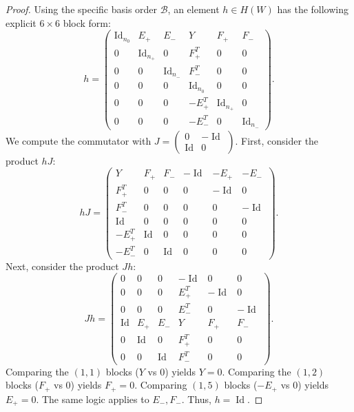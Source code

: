 \documentclass[12pt, final]{article}
\def\Id{\operatorname{Id}}
\begin{document}
\begin{proof}
Using the specific basis order $\mathcal{B}$, an element $h \in H(W)$ has the following explicit $6 \times 6$ block form:
\[
h = \begin{pmatrix}
\Id_{n_0} & E_+ & E_- & Y & F_+ & F_- \\
0 & \Id_{n_+} & 0 & F_+^T & 0 & 0 \\
0 & 0 & \Id_{n_-} & F_-^T & 0 & 0 \\
0 & 0 & 0 & \Id_{n_0} & 0 & 0 \\
0 & 0 & 0 & -E_+^T & \Id_{n_+} & 0 \\
0 & 0 & 0 & -E_-^T & 0 & \Id_{n_-}
\end{pmatrix}.
\]
We compute the commutator with $J = \left(\begin{smallmatrix} 0 & -\Id \\ \Id & 0 \end{smallmatrix}\right)$.
First, consider the product $hJ$:
\[
hJ
=
\begin{pmatrix}
Y & F_+ & F_- & -\Id & -E_+ & -E_- \\
F_+^T & 0 & 0 & 0 & -\Id & 0 \\
F_-^T & 0 & 0 & 0 & 0 & -\Id \\
\Id & 0 & 0 & 0 & 0 & 0 \\
-E_+^T & \Id & 0 & 0 & 0 & 0 \\
-E_-^T & 0 & \Id & 0 & 0 & 0
\end{pmatrix}.
\]
Next, consider the product $Jh$:
\[
Jh=
\begin{pmatrix}
0 & 0 & 0 & -\Id & 0 & 0 \\
0 & 0 & 0 & E_+^T & -\Id & 0 \\
0 & 0 & 0 & E_-^T & 0 & -\Id \\
\Id & E_+ & E_- & Y & F_+ & F_- \\
0 & \Id & 0 & F_+^T & 0 & 0 \\
0 & 0 & \Id & F_-^T & 0 & 0
\end{pmatrix}.
\]
Comparing the $(1,1)$ blocks ($Y$ vs $0$) yields $Y=0$. Comparing the $(1,2)$ blocks ($F_+$ vs $0$) yields $F_+ = 0$. Comparing $(1,5)$ blocks ($-E_+$ vs $0$) yields $E_+ = 0$. The same logic applies to $E_-, F_-$. Thus, $h = \Id$.


\end{proof}
\end{document}
